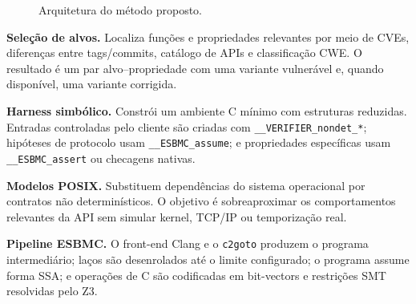 \documentclass[conference]{IEEEtran}
\begin{document}
\begin{figure}[htbp]
\centering
{}
\caption{Arquitetura do m\'etodo proposto.}
\label{fig:architecture}
\end{figure}

\textbf{Sele\c{c}\~ao de alvos.} Localiza fun\c{c}\~oes e propriedades relevantes
por meio de CVEs, diferen\c{c}as entre tags/commits, cat\'alogo de APIs e
classifica\c{c}\~ao CWE. O resultado \'e um par alvo--propriedade com uma variante
vulner\'avel e, quando dispon\'ivel, uma variante corrigida.

\textbf{Harness simb\'olico.} Constr\'oi um ambiente C m\'inimo com estruturas
reduzidas. Entradas controladas pelo cliente s\~ao criadas com
\texttt{\_\_VERIFIER\_nondet\_*}; hip\'oteses de protocolo usam
\texttt{\_\_ESBMC\_assume}; e propriedades espec\'ificas usam
\texttt{\_\_ESBMC\_assert} ou checagens nativas.

\textbf{Modelos POSIX.} Substituem depend\^encias do sistema operacional por
contratos n\~ao determin\'isticos. O objetivo \'e sobreaproximar os comportamentos
relevantes da API sem simular kernel, TCP/IP ou temporiza\c{c}\~ao real.

\textbf{Pipeline ESBMC.} O front-end Clang e o \texttt{c2goto} produzem o
programa intermedi\'ario; la\c{c}os s\~ao desenrolados at\'e o limite configurado;
o programa assume forma SSA; e opera\c{c}\~oes de C s\~ao codificadas em
bit-vectors e restri\c{c}\~oes SMT resolvidas pelo Z3.
\end{document}
